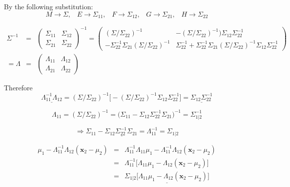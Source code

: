 \documentclass{article}
\begin{document}
By the following substitution:
\begin{equation*}
M \rightarrow \Sigma, \hspace{10pt} E \rightarrow \Sigma_{11}, \hspace{10pt} F \rightarrow \Sigma_{12},  \hspace{10pt} G \rightarrow \Sigma_{21},  \hspace{10pt} H \rightarrow \Sigma_{22}
\end{equation*}

\begin{eqnarray*}
\Sigma^{-1} &=& \begin{pmatrix} \Sigma_{11} & \Sigma_{12} \\ \Sigma_{21} & \Sigma_{22} \end{pmatrix}^{-1}  =  \begin{pmatrix} (\Sigma/\Sigma_{22})^{-1} & -(\Sigma/\Sigma_{22})^{-1}) \Sigma_{12} \Sigma_{22}^{-1} \\ -\Sigma_{22}^{-1} \Sigma_{21} (\Sigma/\Sigma_{22})^{-1} & \Sigma_{22}^{-1} + \Sigma_{22}^{-1} \Sigma_{21} (\Sigma/\Sigma_{22})^{-1} \Sigma_{12} \Sigma_{22}^{-1} \end{pmatrix} \\
= \Lambda  &= & \begin{pmatrix} \Lambda_{11} & \Lambda_{12} \\ \Lambda_{21} & \Lambda_{22} \end{pmatrix} 
\end{eqnarray*}

Therefore
\begin{equation*}
\underline{\Lambda_{11}^{-1} \Lambda_{12}} = (\Sigma/\Sigma_{22})^{-1} \big[ - (\Sigma/\Sigma_{22})^{-1} \Sigma_{12} \Sigma_{22}^{-1} \big] = \underline{\Sigma_{12} \Sigma_{22}^{-1}}
\end{equation*}

\begin{equation*}
\Lambda_{11} = (\Sigma/\Sigma_{22})^{-1} = \big( \Sigma_{11} - \Sigma_{12} \Sigma_{22}^{-1} \Sigma_{21} \big)^{-1} = \Sigma_{1 | 2}^{-1}
\end{equation*}

\begin{equation*}
\Rightarrow \underline{\Sigma_{11} - \Sigma_{12} \Sigma_{22}^{-1} \Sigma_{21} = \Lambda_{11}^{-1}} = \Sigma_{1 | 2}
\end{equation*}

\begin{eqnarray*}
\mu_1 - \Lambda_{11}^{-1} \Lambda_{12} (\textbf{x}_2 - \mu_2) &=& \Lambda_{11}^{-1} \Lambda_{11} \mu_1 - \Lambda_{11}^{-1} \Lambda_{12} (\textbf{x}_2 - \mu_2) \\
&=& \Lambda_{11}^{-1} \big[ \Lambda_{11} \mu_1 - \Lambda_{12} (\textbf{x}_2 - \mu_2) \big] \\
&=& \underline{\Sigma_{1 | 2} \big[ \Lambda_{11} \mu_1 - \Lambda_{12} (\textbf{x}_2 - \mu_2) \big]}
\end{eqnarray*}
\end{document}
